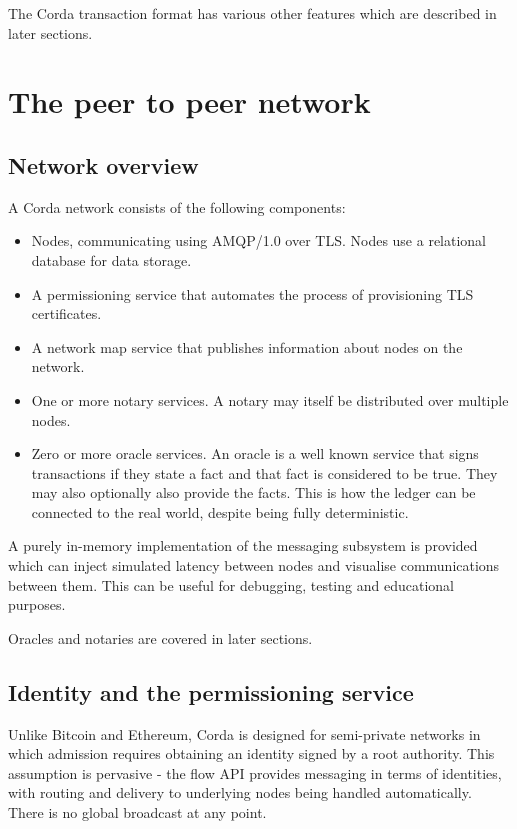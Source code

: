 \documentclass{article}
\begin{document}
The Corda transaction format has various other features which are described in later sections.

\section{The peer to peer network}

\subsection{Network overview}
A Corda network consists of the following components:

\begin{itemize}
\item Nodes, communicating using AMQP/1.0 over TLS. Nodes use a relational database for data storage.
\item A permissioning service that automates the process of provisioning TLS certificates.
\item A network map service that publishes information about nodes on the network.
\item One or more notary services. A notary may itself be distributed over multiple nodes.
\item Zero or more oracle services. An oracle is a well known service that signs transactions if they state a fact
and that fact is considered to be true. They may also optionally also provide the facts. This is how the ledger can be
connected to the real world, despite being fully deterministic.
\end{itemize}

A purely in-memory implementation of the messaging subsystem is provided which can inject simulated latency between
nodes and visualise communications between them. This can be useful for debugging, testing and educational purposes.

Oracles and notaries are covered in later sections.

\subsection{Identity and the permissioning service}

Unlike Bitcoin and Ethereum, Corda is designed for semi-private networks in which admission requires obtaining an
identity signed by a root authority. This assumption is pervasive - the flow API provides messaging in terms of identities,
with routing and delivery to underlying nodes being handled automatically. There is no global broadcast at any point.
\end{document}
